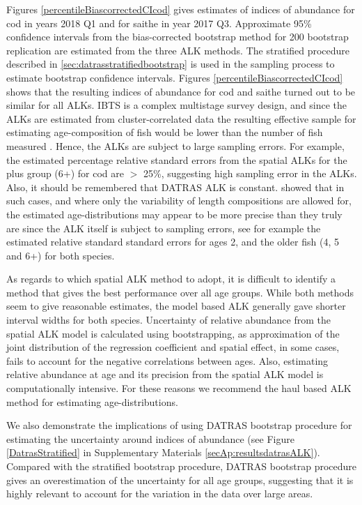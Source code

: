 \documentclass[a4paper 12pt]{article}
\numberwithin{equation}{section}
\begin{document}
Figures \ref{percentileBiascorrectedCIcod} gives estimates of indices of abundance for cod in years 2018 Q1 and for saithe in year 2017 Q3. Approximate 95\% confidence intervals from the bias-corrected bootstrap method for 200 bootstrap replication are estimated from the three ALK methods. The stratified procedure described in \ref{sec:datrasstratifiedbootstrap} is used in the sampling process to estimate bootstrap confidence intervals.   Figures \ref{percentileBiascorrectedCIcod}  shows that the resulting indices of abundance for cod and saithe turned out to be similar for all ALKs. IBTS is a complex multistage survey design, and since the ALKs are estimated from cluster-correlated data the resulting effective sample for estimating age-composition of fish would be lower than the number of fish measured \citep{ICES2013PICS3}. Hence, the ALKs are subject to large sampling errors. For example, the estimated percentage relative standard errors from the spatial ALKs for the plus group (6+) for cod are $>$ 25\%, suggesting high sampling error in the ALKs. Also, it should be remembered that DATRAS ALK is constant.   \citet{aanes2015efficient} showed that in such cases, and where only the variability of  length compositions are allowed for, the estimated age-distributions may appear to be more precise than they truly are since the ALK itself is subject to sampling errors, see for example the estimated relative standard standard errors for ages 2, and the older fish (4, 5 and 6+) for both species. 

As regards to which spatial ALK method to adopt, it is difficult to identify a method that gives the best performance over all age groups. While both methods seem to give reasonable estimates, the model based ALK generally gave shorter interval widths for both species. Uncertainty of relative abundance from the spatial ALK model is calculated using bootstrapping, as approximation of the joint distribution of the regression coefficient and spatial effect, in some cases, fails to account for the  negative correlations between ages. Also, estimating relative abundance at age and its precision from the spatial ALK model is computationally intensive. For these reasons we recommend the haul based ALK method for estimating age-distributions.

We also demonstrate the implications of using DATRAS bootstrap procedure for estimating the uncertainty around indices of abundance (see Figure \ref{DatrasStratified} in Supplementary Materials \ref{secAp:resultsdatrasALK}). Compared with the stratified bootstrap procedure, DATRAS bootstrap procedure gives an overestimation of the uncertainty for all age groups, suggesting that it is highly relevant to account for the variation in the data over large areas. 
\end{document}
